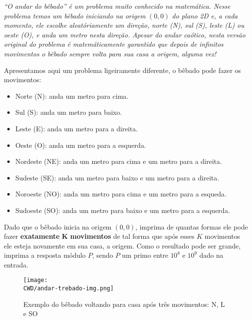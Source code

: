 %
\begin{center}
\textit{“O andar do bêbado” é um problema muito conhecido na matemática. Nesse problema temos um bêbado iniciando na origem $(0, 0)$ do plano 2D e, a cada momento, ele escolhe aleatóriamente um direção, norte (N), sul (S), leste (L) ou oeste (O), e anda um metro nesta direção. Apesar do andar caótico, nesta versão original do problema é matemáticamente garantido que depois de infinitos movimentos o bêbado sempre volta para sua casa a origem, alguma vez!}
\end{center}

Apresentamos aqui um problema ligeiramente diferente, o bêbado pode fazer os movimentos:
\begin{itemize}
    \item Norte (N): anda um metro para cima.
    \item Sul (S): anda um metro para baixo.
    \item Leste (E): anda um metro para a direita.
    \item Oeste (O): anda um metro para a esquerda.
    \item Nordeste (NE): anda um metro para cima e um metro para a direita.
    \item Sudeste (SE): anda um metro para baixo e um metro para a direita.
    \item Noroeste (NO): anda um metro para cima e um metro para a esqueda.
    \item Sudoeste (SO): anda um metro para baixo e um metro para a esquerda.
\end{itemize}

Dado que o bêbado inicia na origem $(0, 0)$, imprima de quantas formas ele pode fazer \textbf{exatamente} $\boldsymbol K$ \textbf{movimentos} de tal forma que após esses $K$ movimentos ele esteja novamente em sua casa, a origem. Como o resultado pode ser grande, imprima a resposta módulo $P$, sendo $P$ um primo entre $10^8$ e $10^9$ dado na entrada.

\begin{figure}[H]
    \centering
    \texttt{[image: \\CWD/andar-trebado-img.png]}
    \caption{Exemplo do bêbado voltando para casa após três movimentos: N, L e SO}
\end{figure}


